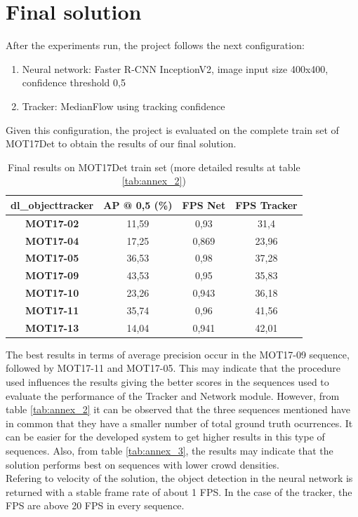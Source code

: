 \section{Final solution}\label{final_sol}
After the experiments run, the project follows the next configuration:
\begin{enumerate}
    \item Neural network: Faster R-CNN InceptionV2, image input size 400x400, confidence threshold 0,5
    \item Tracker: MedianFlow using tracking confidence
\end{enumerate}
Given this configuration, the project is evaluated on the complete train set of MOT17Det to obtain the results of our final solution.
\begin{table}[H]
\begin{center}
\begin{tabular}{|c|c|c|c|}
\hline
\textbf{dl\_objecttracker} & \textbf{AP @ 0,5 (\%)} & \textbf{FPS Net} & \multicolumn{1}{l|}{\textbf{FPS Tracker}} \\ \hline
\textbf{MOT17-02}          & 11,59                  & 0,93             & 31,4                                      \\ \hline
\textbf{MOT17-04}          & 17,25                  & 0,869            & 23,96                                     \\ \hline
\textbf{MOT17-05}          & 36,53                  & 0,98             & 37,28                                     \\ \hline
\textbf{MOT17-09}          & 43,53                  & 0,95             & 35,83                                     \\ \hline
\textbf{MOT17-10}          & 23,26                  & 0,943            & 36,18                                     \\ \hline
\textbf{MOT17-11}          & 35,74                  & 0,96             & 41,56                                     \\ \hline
\textbf{MOT17-13}          & 14,04                  & 0,941            & 42,01                                     \\ \hline
\end{tabular}
\end{center}
\caption{Final results on MOT17Det train set (more detailed results at table \ref{tab:annex_2})}
\label{tab:final}
\end{table}
The best results in terms of average precision occur in the MOT17-09 sequence, followed by MOT17-11 and MOT17-05. This may indicate that the procedure used influences the results giving the better scores in the sequences used to evaluate the performance of the Tracker and Network module. However, from table \ref{tab:annex_2} it can be observed that the three sequences mentioned have in common that they have a smaller number of total ground truth ocurrences. It can be easier for the developed system to get higher results in this type of sequences. Also, from table \ref{tab:annex_3}, the results may indicate that the solution performs best on sequences with lower crowd densities.\\
Refering to velocity of the solution, the object detection in the neural network is returned with a stable frame rate of about 1 FPS. In the case of the tracker, the FPS are above 20 FPS in every sequence.